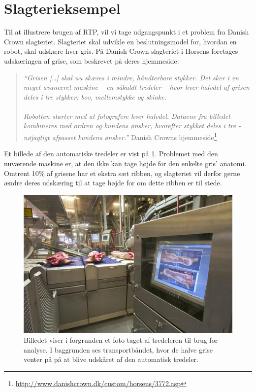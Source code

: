 \section{Slagterieksempel}
Til at illustrere brugen af RTP, vil vi tage udgangspunkt i et problem fra Danish Crown slagteriet. Slagteriet skal udvikle en beslutningsmodel for, hvordan en robot, skal udskære hver gris. På Danish Crown slagteriet i Horsens foretages udskæringen af grise, som beskrevet på deres hjemmeside:

\begin{quote}\textit{``Grisen [\ldots] skal nu skæres i mindre, håndterbare stykker. Det sker i en meget avanceret maskine -- en såkaldt tredeler -- hvor hver halvdel af grisen deles i tre stykker: bov, mellemstykke og skinke. \\ 
\\
Robotten starter med at fotografere hver halvdel. Dataene fra billedet kombineres med ordren og kundens ønsker, hvorefter stykket deles i tre - nøjagtigt afpasset kundens ønsker.''}{ Danish Crowns hjemmeside\footnote{\url{http://www.danishcrown.dk/custom/horsens/3772.asp}}}\end{quote}

Et billede af den automatiske tredeler er vist  på \cref{fig:pig}. Problemet med den nuværende maskine er, at den ikke kan tage højde for den enkelte gris' anatomi. Omtrent 10\% af grisene har et ekstra sæt ribben, og slagteriet vil derfor gerne ændre deres udskæring til at tage højde for om dette ribben er til stede. 

\begin{figure}
 \begin{center}
  \includegraphics[scale=0.5]{images/209690-1}
	\caption{Billedet viser i forgrunden  et foto taget af tredeleren til brug for analyse. I baggrunden ses transportbåndet, hvor de halve  grise venter på på at blive udskåret af den automatisk tredeler.}
	\label{fig:pig}
\end{center}
\end{figure}


